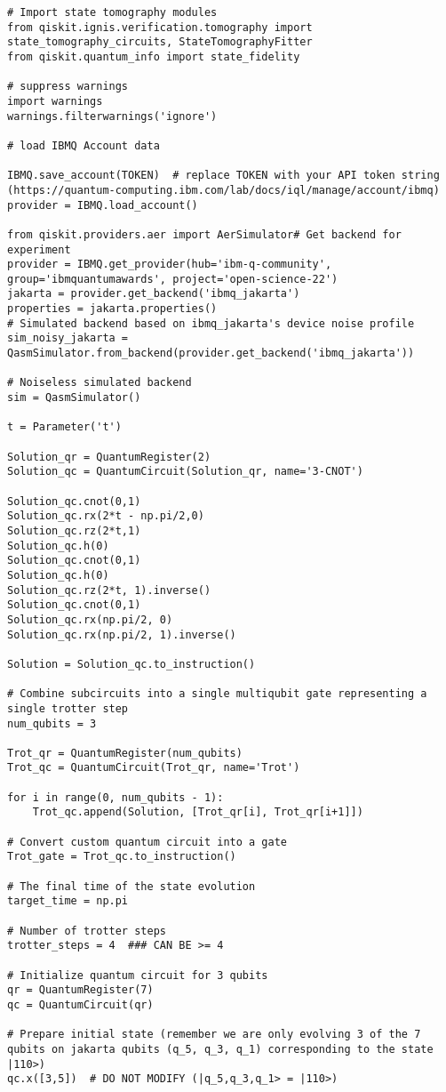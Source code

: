 \begin{verbatim}
# Import state tomography modules
from qiskit.ignis.verification.tomography import state_tomography_circuits, StateTomographyFitter
from qiskit.quantum_info import state_fidelity

# suppress warnings
import warnings
warnings.filterwarnings('ignore')

# load IBMQ Account data

IBMQ.save_account(TOKEN)  # replace TOKEN with your API token string (https://quantum-computing.ibm.com/lab/docs/iql/manage/account/ibmq)
provider = IBMQ.load_account()

from qiskit.providers.aer import AerSimulator# Get backend for experiment
provider = IBMQ.get_provider(hub='ibm-q-community', group='ibmquantumawards', project='open-science-22')
jakarta = provider.get_backend('ibmq_jakarta')
properties = jakarta.properties()
# Simulated backend based on ibmq_jakarta's device noise profile
sim_noisy_jakarta = QasmSimulator.from_backend(provider.get_backend('ibmq_jakarta'))

# Noiseless simulated backend
sim = QasmSimulator()

t = Parameter('t')

Solution_qr = QuantumRegister(2)
Solution_qc = QuantumCircuit(Solution_qr, name='3-CNOT')

Solution_qc.cnot(0,1)
Solution_qc.rx(2*t - np.pi/2,0)
Solution_qc.rz(2*t,1)
Solution_qc.h(0)
Solution_qc.cnot(0,1)
Solution_qc.h(0)
Solution_qc.rz(2*t, 1).inverse()
Solution_qc.cnot(0,1)
Solution_qc.rx(np.pi/2, 0)
Solution_qc.rx(np.pi/2, 1).inverse()

Solution = Solution_qc.to_instruction()

# Combine subcircuits into a single multiqubit gate representing a single trotter step
num_qubits = 3

Trot_qr = QuantumRegister(num_qubits)
Trot_qc = QuantumCircuit(Trot_qr, name='Trot')

for i in range(0, num_qubits - 1):
    Trot_qc.append(Solution, [Trot_qr[i], Trot_qr[i+1]])

# Convert custom quantum circuit into a gate
Trot_gate = Trot_qc.to_instruction()

# The final time of the state evolution
target_time = np.pi

# Number of trotter steps
trotter_steps = 4  ### CAN BE >= 4

# Initialize quantum circuit for 3 qubits
qr = QuantumRegister(7)
qc = QuantumCircuit(qr)

# Prepare initial state (remember we are only evolving 3 of the 7 qubits on jakarta qubits (q_5, q_3, q_1) corresponding to the state |110>)
qc.x([3,5])  # DO NOT MODIFY (|q_5,q_3,q_1> = |110>)


\end{verbatim}
